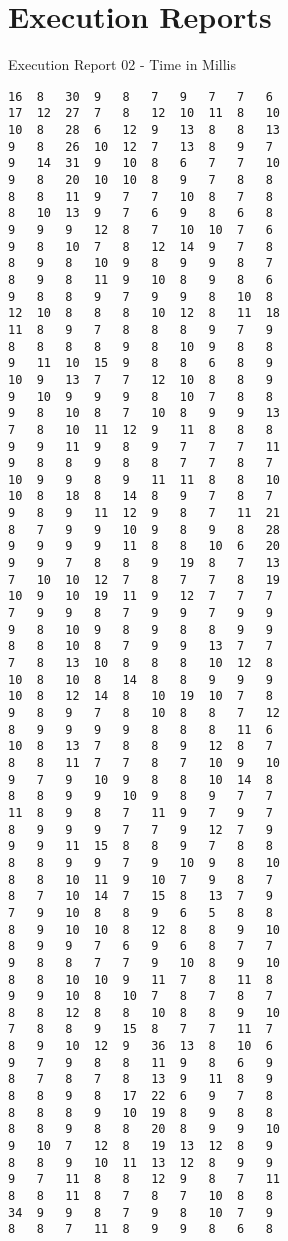 \apendice
\chapter{Execution Reports}
\label{executionreport02}

Execution Report 02 - Time in Millis
\begin{lstlisting}
16	8	30	9	8	7	9	7	7	6
17	12	27	7	8	12	10	11	8	10
10	8	28	6	12	9	13	8	8	13
9	8	26	10	12	7	13	8	9	7
9	14	31	9	10	8	6	7	7	10
9	8	20	10	10	8	9	7	8	8
8	8	11	9	7	7	10	8	7	8
8	10	13	9	7	6	9	8	6	8
9	9	9	12	8	7	10	10	7	6
9	8	10	7	8	12	14	9	7	8
8	9	8	10	9	8	9	9	8	7
8	9	8	11	9	10	8	9	8	6
9	8	8	9	7	9	9	8	10	8
12	10	8	8	8	10	12	8	11	18
11	8	9	7	8	8	8	9	7	9
8	8	8	8	9	8	10	9	8	8
9	11	10	15	9	8	8	6	8	9
10	9	13	7	7	12	10	8	8	9
9	10	9	9	9	8	10	7	8	8
9	8	10	8	7	10	8	9	9	13
7	8	10	11	12	9	11	8	8	8
9	9	11	9	8	9	7	7	7	11
9	8	8	9	8	8	7	7	8	7
10	9	9	8	9	11	11	8	8	10
10	8	18	8	14	8	9	7	8	7
9	8	9	11	12	9	8	7	11	21
8	7	9	9	10	9	8	9	8	28
9	9	9	9	11	8	8	10	6	20
9	9	7	8	8	9	19	8	7	13
7	10	10	12	7	8	7	7	8	19
10	9	10	19	11	9	12	7	7	7
7	9	9	8	7	9	9	7	9	9
9	8	10	9	8	9	8	8	9	9
8	8	10	8	7	9	9	13	7	7
7	8	13	10	8	8	8	10	12	8
10	8	10	8	14	8	8	9	9	9
10	8	12	14	8	10	19	10	7	8
9	8	9	7	8	10	8	8	7	12
8	9	9	9	9	8	8	8	11	6
10	8	13	7	8	8	9	12	8	7
8	8	11	7	7	8	7	10	9	10
9	7	9	10	9	8	8	10	14	8
8	8	9	9	10	9	8	9	7	7
11	8	9	8	7	11	9	7	9	7
8	9	9	9	7	7	9	12	7	9
9	9	11	15	8	8	9	7	8	8
8	8	9	9	7	9	10	9	8	10
8	8	10	11	9	10	7	9	8	7
8	7	10	14	7	15	8	13	7	9
7	9	10	8	8	9	6	5	8	8
8	9	10	10	8	12	8	8	9	10
8	9	9	7	6	9	6	8	7	7
9	8	8	7	7	9	10	8	9	10
8	8	10	10	9	11	7	8	11	8
9	9	10	8	10	7	8	7	8	7
8	8	12	8	8	10	8	8	9	10
7	8	8	9	15	8	7	7	11	7
8	9	10	12	9	36	13	8	10	6
9	7	9	8	8	11	9	8	6	9
8	7	8	7	8	13	9	11	8	9
8	8	9	8	17	22	6	9	7	8
8	8	8	9	10	19	8	9	8	8
8	8	9	8	8	20	8	9	9	10
9	10	7	12	8	19	13	12	8	9
8	8	9	10	11	13	12	8	9	9
9	7	11	8	8	12	9	8	7	11
8	8	11	8	7	8	7	10	8	8
34	9	9	8	7	9	8	10	7	9
8	8	7	11	8	9	9	8	6	8
\end{lstlisting}